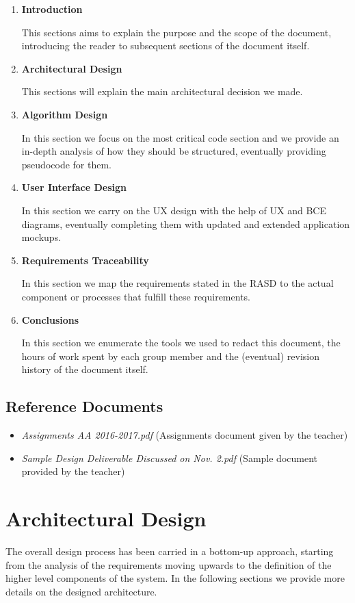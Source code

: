 \documentclass[11pt]{article} %
\begin{document}
\begin{enumerate}
	\item \textbf{Introduction}

	This sections aims to explain the purpose and the scope of the document, introducing the reader to subsequent sections of the document itself.

	\item \textbf{Architectural Design}
	 
	This sections will explain the main architectural decision we made.

	\item \textbf{Algorithm Design}

	In this section we focus on the most critical code section and we provide an in-depth analysis of how they should be structured, eventually providing pseudocode for them.
	
	\item \textbf{User Interface Design}

	In this section we carry on the UX design with the help of UX and BCE diagrams, eventually completing them with updated and extended application mockups.

	\item \textbf{Requirements Traceability}
	
	In this section we map the requirements stated in the RASD to the actual component or processes that fulfill these requirements.

	\item \textbf{Conclusions}

	In this section we enumerate the tools we used to redact this document, the hours of work spent by each group member and the (eventual) revision history of the document itself.
\end{enumerate}

\subsection{Reference Documents}
\begin{itemize}
	\item \textit{Assignments AA 2016-2017.pdf} (Assignments document given by the teacher)
	\item \textit{Sample Design Deliverable Discussed on Nov. 2.pdf} (Sample document provided by the teacher)
  \end{itemize}




\newpage
\section{Architectural Design}
The overall design process has been carried in a bottom-up approach, starting from the analysis of the requirements moving upwards to the definition of the higher level components of the system. In the following sections we provide more details on the designed architecture.
\end{document}
